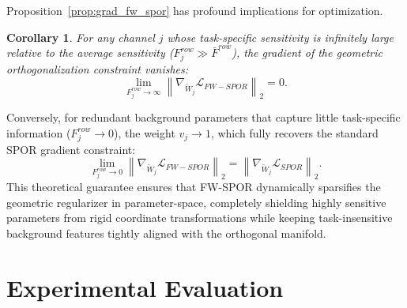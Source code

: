 \documentclass{article}
\theoremstyle{plain}
\newtheorem{corollary}[theorem]{Corollary}
\theoremstyle{definition}
\theoremstyle{remark}
\begin{document}
Proposition~\ref{prop:grad_fw_spor} has profound implications for optimization.
\begin{corollary}\label{corr:limit_grad}
For any channel $j$ whose task-specific sensitivity is infinitely large relative to the average sensitivity ($F^{row}_j \gg \bar{F}^{row}$), the gradient of the geometric orthogonalization constraint vanishes:
\begin{equation}
    \lim_{F^{row}_j \to \infty} \left\| \nabla_{\tilde{W}_j} \mathcal{L}_{FW-SPOR} \right\|_2 = 0.
\end{equation}
\end{corollary}
Conversely, for redundant background parameters that capture little task-specific information ($F^{row}_j \to 0$), the weight $v_j \to 1$, which fully recovers the standard SPOR gradient constraint:
\begin{equation}
    \lim_{F^{row}_j \to 0} \left\| \nabla_{\tilde{W}_j} \mathcal{L}_{FW-SPOR} \right\|_2 = \left\| \nabla_{\tilde{W}_j} \mathcal{L}_{SPOR} \right\|_2.
\end{equation}
This theoretical guarantee ensures that FW-SPOR dynamically sparsifies the geometric regularizer in parameter-space, completely shielding highly sensitive parameters from rigid coordinate transformations while keeping task-insensitive background features tightly aligned with the orthogonal manifold.

\section{Experimental Evaluation}
\label{sec:experiments}
\end{document}
